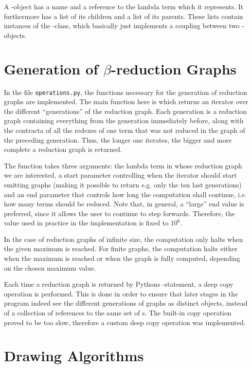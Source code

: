 A -object has a name and a reference to the lambda term which it
represents. It furthermore has a list of its children and a list of its
parents. These lists contain instances of the -class, which
basically just implements a coupling between two -objects.

\section{Generation of $\beta$-reduction Graphs}

In the file \texttt{operations.py}, the functions necessary for the generation
of reduction graphs are implemented. The main function here is
 which returns an iterator over the different
``generations'' of the reduction graph. Each generation is a reduction graph
containing everything from the generation immediately before, along with the
contracta of all the redexes of one term that was not reduced in the graph of
the preceding generation. Thus, the longer one iterates, the bigger and more
complete a reduction graph is returned. 

The function takes three arguments: the lambda term in whose reduction graph
we are interested, a start parameter controlling when the iterator should
start emitting graphs (making it possible to return e.g. only the ten last
generations) and an end parameter that controls how long the computation shall
continue, i.e. how many terms should be reduced. Note that, in general, a
``large'' end value is preferred, since it allows the user to continue to step
forwards. Therefore, the value used in practice in the implementation is fixed
to $10^6$.

{\textcolor{black}
In the case of reduction graphs of infinite size, the computation only halts
when the given maximum is reached. For finite graphs, the computation halts
either when the maximum is reached or when the graph is fully computed,
depending on the chosen maximum value.

Each time a reduction graph is returned by Pythons -statement, a
deep copy operation is performed. This is done in order to ensure that later
stages in the program indeed see the different generations of graphs as
distinct objects, instead of a collection of references to the same set of
s. The built-in copy operation  proved to
be too slow, therefore a custom deep copy operation was implemented.
}
\section{Drawing Algorithms}

